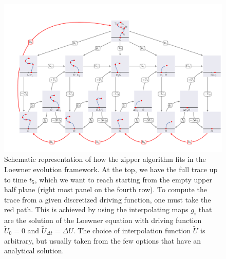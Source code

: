 \begin{figure}
\begin{center}
    \includegraphics[scale=0.34]{chapters/ch4-sle/figs/zipperdiag}
\end{center}
\caption{Schematic representation of how the zipper algorithm fits in the
    Loewner evolution framework. At the top, we have the full trace up to time
    $t_5$, which we want to reach starting from the empty upper half plane
    (right most panel on the fourth row). To compute the trace from a given
    discretized driving function, one must take the red path. This is achieved
    by using the interpolating maps $g_i$ that are the solution of the Loewner
    equation with driving function $\tilde{U}_0=0$ and $\tilde{U}_{\Delta
    t}=\Delta U$. The choice of interpolation function $\tilde{U}$ is
    arbitrary, but usually taken from the few options that have an analytical
    solution.}
\label{fig:zipperdiag}
\end{figure}

